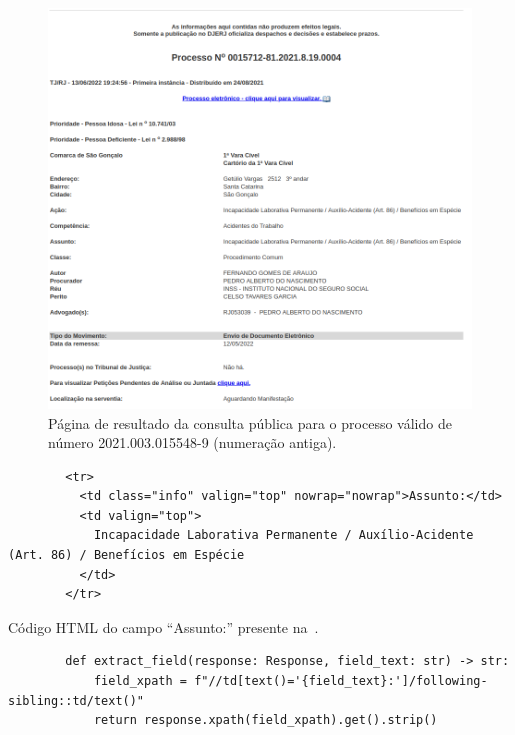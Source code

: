 \begin{figure}[H]
    \centering{}
    \includegraphics{img/exemplo-resultado-consulta-publica-1.png}
    \caption{%
        Página de resultado da consulta pública para o processo válido de
        número 2021.003.015548-9 (numeração antiga).
    }
    \label{fig:exemplo-pagina-ww4}
\end{figure}

\begin{listing}
    \centering{}
    \begin{verbatim}
        <tr>
          <td class="info" valign="top" nowrap="nowrap">Assunto:</td>
          <td valign="top">
            Incapacidade Laborativa Permanente / Auxílio-Acidente (Art. 86) / Benefícios em Espécie
          </td>
        </tr>
    \end{verbatim}
    \caption{Código HTML do campo ``Assunto:'' presente na~.}
    \label{cod:html-assunto}
\end{listing}

\begin{listing}[htb]
    \centering{}
    \begin{verbatim}
        def extract_field(response: Response, field_text: str) -> str:
            field_xpath = f"//td[text()='{field_text}:']/following-sibling::td/text()"
            return response.xpath(field_xpath).get().strip()
    \end{verbatim}
    \caption{%
        Código da função responsável pela extração de um campo em uma resposta
        de uma requisição a uma página de visualização de processo.
    }
    \label{cod:extract_field}
\end{listing}


